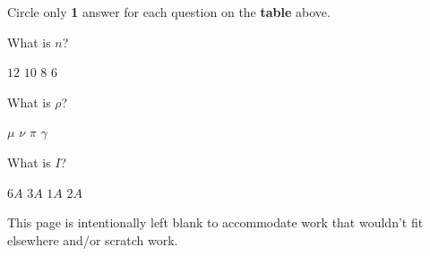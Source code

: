 \documentclass[letterpaper,12pt,addpoints]{exam}
\begin{document}
\medskip
\noindent
\begin{description}
\item Circle only \textbf{1} answer for each question on the \textbf{table} above. \\
\end{description}
\clearpage

\begin{questions}

\question What is $n$?

\begin{oneparchoices}
\choice $12$ 
\choice $10$ 
\choice $8$ 
\CorrectChoice $6$
\end{oneparchoices}

\question What is $\rho$?

\begin{oneparchoices}
\CorrectChoice $\mu$ 
\choice $\nu$ 
\choice $\pi$ 
\choice $\gamma$
\end{oneparchoices}

\question What is $I$?

\begin{oneparchoices}
\choice $6A$ 
\choice $3A$ 
\CorrectChoice $1A$ 
\choice $2A$
\end{oneparchoices}

\end{questions}

\clearpage
This page is intentionally left blank to accommodate work that wouldn't fit elsewhere and/or scratch work.
\end{document}
